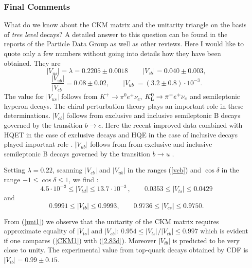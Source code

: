 \documentclass[12pt]{article}
\newcommand{\vcb}{|V_{cb}|}
\newcommand{\vtd}{|V_{td}|}
\newcommand{\vts}{|V_{ts}|}
\begin{document}
\begin{itemize}
\subsubsection{Final Comments}
What do we know about the CKM matrix and the unitarity triangle on the
basis of {\it tree level} decays? A detailed answer to this question
can be found in the reports of
the Particle Data Group \cite{PDG} as well as other reviews.
Here I would like to quote only a few numbers without going into
details how they have been obtained. They are
\begin{equation}\label{vcb}
|V_{us}| = \lambda =  0.2205 \pm 0.0018\,
\quad\quad
\vcb=0.040\pm0.003,
\end{equation}
\begin{equation}\label{v13}
\frac{|V_{ub}|}{\vcb}=0.08\pm0.02, \quad\quad
|V_{ub}|=(3.2\pm0.8)\cdot 10^{-3}.
\end{equation}
The value for $|V_{us}|$ follows from 
$K^+\to \pi^0 e^+ \nu_e$, $K_{\rm L}^0 \to\pi^-e^+ \nu_e$ and
semileptonic hyperon decays. The chiral perturbation theory
\cite{LER1,DHK} plays an important role in these determinations.
$\vcb$ follows from exclusive and inclusive semileptonic B decays
governed by the transition $b \to c$. 
Here the recent improved data \cite{Gibbons} combined with
 HQET in the case of exclusive decays and HQE in the case of
inclusive decays played important role \cite{SUV,Neubert,Braun,CZMI}.
$|V_{ub}|$ follows from from exclusive and inclusive semileptonic B decays
governed by the transition $b \to u$
\cite{Gibbons,CLEOU}.

Setting $\lambda=0.22$, scanning $\vcb$ and $|V_{ub}|$ in
the ranges (\ref{vcb})  and $\cos\delta$ in
the range $-1\leq \cos\delta\leq 1$, we find \cite{BF97}:
\begin{equation}\label{uni1}
4.5\cdot 10^{-3}\leq \vtd \leq 13.7\cdot 10^{-3}\,,
\qquad
0.0353\leq \vts \leq 0.0429
\end{equation}
and
\begin{equation}\label{uni2}
0.9991\leq |V_{tb}| \leq 0.9993,
\qquad
0.9736\leq |V_{cs}| \leq 0.9750.
\end{equation}

From (\ref{uni1}) we observe
that the unitarity of the CKM matrix requires approximate equality of 
$\vts$ and $\vcb$:
$0.954\leq |V_{ts}|/\vcb \leq 0.997$
which is evident if one compares (\ref{CKM1}) with (\ref{2.83d}).
Moreover $|V_{tb}|$ is predicted to be very close to unity.
The experimental value from top-quark decays obtained by CDF is
$|V_{tb}|=0.99\pm 0.15$.


\end{itemize}
\end{document}
